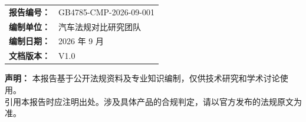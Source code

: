 \begin{titlepage}
\begin{center}
\vspace{2cm}

\begin{tabular}{rl}
    \textbf{报告编号：}    &  GB4785-CMP-2026-09-001 \\
    \textbf{编制单位：}    &  汽车法规对比研究团队 \\
    \textbf{编制日期：}    &  2026 年 9 月 \\
    \textbf{文档版本：}    &  V1.0 \\
\end{tabular}

\vspace{2cm}

\begin{flushleft}
\footnotesize
\textbf{声明：} 本报告基于公开法规资料及专业知识编制，仅供技术研究和学术讨论使用。\\
引用本报告时应注明出处。涉及具体产品的合规判定，请以官方发布的法规原文为准。
\end{flushleft}

\end{center}
\end{titlepage}

\thispagestyle{empty}
\clearpage